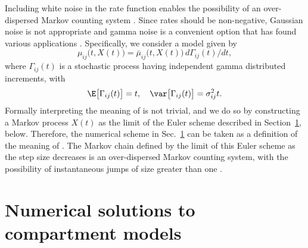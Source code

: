 Including white noise in the rate function enables the possibility of an over-dispersed Markov counting system \cite{breto11,breto09,he10}.
Since rates should be non-negative, Gaussian noise is not appropriate and gamma noise is a convenient option that has found various applications \cite{romero-severson15, subramanian20}.
Specifically, we consider a model given by
\begin{equation}
\label{eq:odmcs1}
\mu_{ij}\big(t,X(t)\big) = \bar\mu_{ij}\big(t,X(t)\big) \, d\Gamma_{ij}(t)/dt,
\end{equation}
where $\Gamma_{ij}(t)$ is a stochastic process having independent gamma distributed increments, with
\begin{equation}
\label{eq:odmcs2}
\E\big[\Gamma_{ij}(t)\big] = t, \quad \var\big[\Gamma_{ij}(t)\big] = \sigma_{ij}^2 t.
\end{equation}
Formally interpreting the meaning of  is not trivial, and we do so by constructing a Markov process $X(t)$ as the limit of the Euler scheme described in Section~\ref{sec:numerics}, below.
Therefore, the numerical scheme in Sec.~\ref{sec:numerics} can be taken as a definition of the meaning of .
The Markov chain defined by the limit of this Euler scheme as the step size decreases is an over-dispersed Markov counting system, with the possibility of instantaneous jumps of size greater than one \cite{breto11}.

\section{Numerical solutions to compartment models}
\label{sec:numerics}

